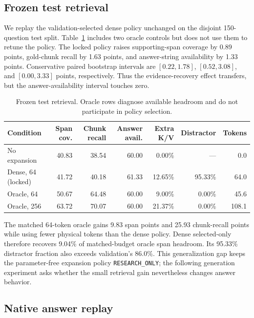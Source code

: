 \documentclass[11pt]{article}
\begin{document}
\subsection{Frozen test retrieval}

We replay the validation-selected dense policy unchanged on the disjoint
150-question test split. Table~\ref{tab:expansion-test} includes two oracle
controls but does not use them to retune the policy. The locked policy raises
supporting-span coverage by 0.89 points, gold-chunk recall by 1.63 points, and
answer-string availability by 1.33 points. Conservative paired bootstrap
intervals are $[0.22,1.78]$, $[0.52,3.08]$, and $[0.00,3.33]$ points,
respectively. Thus the evidence-recovery effect transfers, but the
answer-availability interval touches zero.

\begin{table}[t]
\centering
\small
\caption{Frozen test retrieval. Oracle rows diagnose available headroom and
do not participate in policy selection.}
\label{tab:expansion-test}
\begin{tabular}{lrrrrrr}
\toprule
Condition & Span cov. & Chunk recall & Answer avail. & Extra K/V & Distractor & Tokens \\
\midrule
No expansion & 40.83 & 38.54 & 60.00 & 0.00\% & --- & 0.0 \\
Dense, 64 (locked) & 41.72 & 40.18 & 61.33 & 12.65\% & 95.33\% & 64.0 \\
Oracle, 64 & 50.67 & 64.48 & 60.00 & 9.00\% & 0.00\% & 45.6 \\
Oracle, 256 & 63.72 & 70.07 & 60.00 & 21.37\% & 0.00\% & 108.1 \\
\bottomrule
\end{tabular}
\end{table}

The matched 64-token oracle gains 9.83 span points and 25.93 chunk-recall
points while using fewer physical tokens than the dense policy. Dense
selected-only therefore recovers 9.04\% of matched-budget oracle span
headroom. Its 95.33\% distractor fraction also exceeds validation's 86.0\%.
This generalization gap keeps the parameter-free expansion policy
\texttt{RESEARCH\_ONLY}; the following generation experiment asks whether
the small retrieval gain nevertheless changes answer behavior.

\subsection{Native answer replay}
\end{document}

